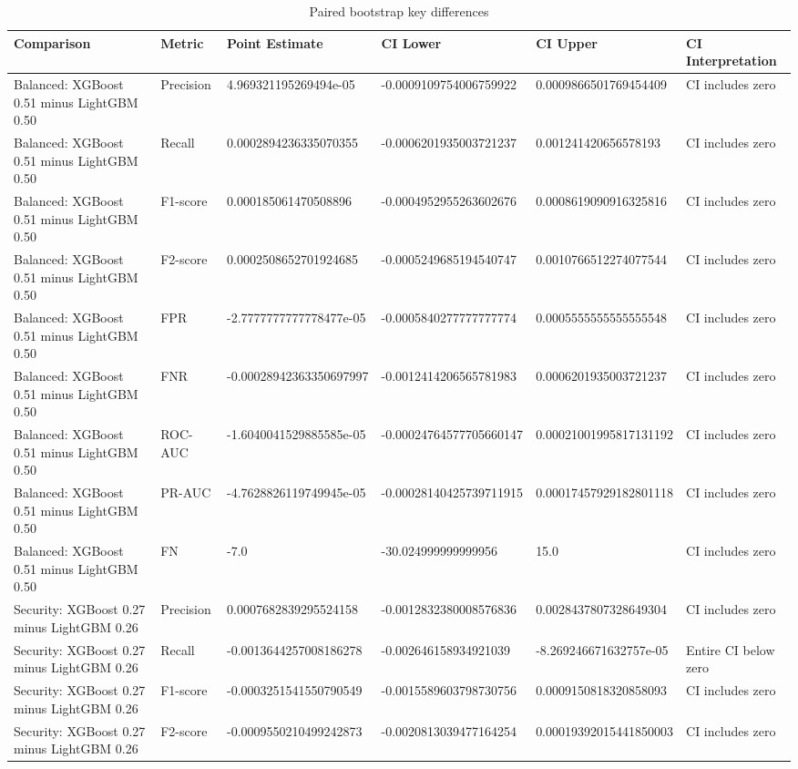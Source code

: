 \begin{table}[htbp]
\centering
\caption{Paired bootstrap key differences}
\begin{tabular}{llllll}
\hline
Comparison & Metric & Point Estimate & CI Lower & CI Upper & CI Interpretation \\
\hline
Balanced: XGBoost 0.51 minus LightGBM 0.50 & Precision & 4.969321195269494e-05 & -0.0009109754006759922 & 0.0009866501769454409 & CI includes zero \\
Balanced: XGBoost 0.51 minus LightGBM 0.50 & Recall & 0.0002894236335070355 & -0.0006201935003721237 & 0.001241420656578193 & CI includes zero \\
Balanced: XGBoost 0.51 minus LightGBM 0.50 & F1-score & 0.000185061470508896 & -0.0004952955263602676 & 0.0008619090916325816 & CI includes zero \\
Balanced: XGBoost 0.51 minus LightGBM 0.50 & F2-score & 0.0002508652701924685 & -0.0005249685194540747 & 0.0010766512274077544 & CI includes zero \\
Balanced: XGBoost 0.51 minus LightGBM 0.50 & FPR & -2.7777777777778477e-05 & -0.0005840277777777774 & 0.0005555555555555548 & CI includes zero \\
Balanced: XGBoost 0.51 minus LightGBM 0.50 & FNR & -0.00028942363350697997 & -0.0012414206565781983 & 0.0006201935003721237 & CI includes zero \\
Balanced: XGBoost 0.51 minus LightGBM 0.50 & ROC-AUC & -1.6040041529885585e-05 & -0.00024764577705660147 & 0.00021001995817131192 & CI includes zero \\
Balanced: XGBoost 0.51 minus LightGBM 0.50 & PR-AUC & -4.7628826119749945e-05 & -0.00028140425739711915 & 0.00017457929182801118 & CI includes zero \\
Balanced: XGBoost 0.51 minus LightGBM 0.50 & FN & -7.0 & -30.024999999999956 & 15.0 & CI includes zero \\
Security: XGBoost 0.27 minus LightGBM 0.26 & Precision & 0.0007682839295524158 & -0.0012832380008576836 & 0.0028437807328649304 & CI includes zero \\
Security: XGBoost 0.27 minus LightGBM 0.26 & Recall & -0.0013644257008186278 & -0.002646158934921039 & -8.269246671632757e-05 & Entire CI below zero \\
Security: XGBoost 0.27 minus LightGBM 0.26 & F1-score & -0.0003251541550790549 & -0.0015589603798730756 & 0.0009150818320858093 & CI includes zero \\
Security: XGBoost 0.27 minus LightGBM 0.26 & F2-score & -0.0009550210499242873 & -0.0020813039477164254 & 0.00019392015441850003 & CI includes zero \\

\end{tabular}
\end{table}
